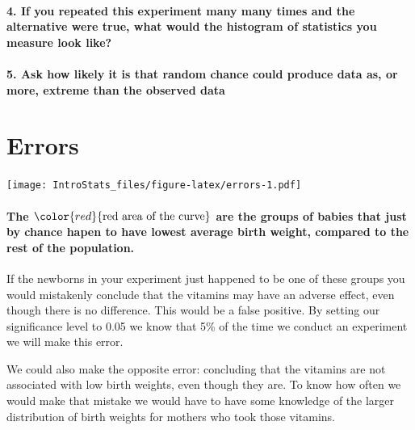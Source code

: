 \documentclass[]{article}
\let\oldparagraph\paragraph
\renewcommand{\paragraph}[1]{\oldparagraph{#1}\mbox{}}
\begin{document}
{{{{\paragraph{4. If you repeated this experiment many many times and the
alternative were true, what would the histogram of statistics you
measure look
like?}\label{if-you-repeated-this-experiment-many-many-times-and-the-alternative-were-true-what-would-the-histogram-of-statistics-you-measure-look-like}

\paragraph{5. Ask how likely it is that random chance could produce data
as, or more, extreme than the observed
data}\label{ask-how-likely-it-is-that-random-chance-could-produce-data-as-or-more-extreme-than-the-observed-data}

\section{Errors}\label{errors}

\texttt{[image: IntroStats\_files/figure-latex/errors-1.pdf]}

\paragraph{\texorpdfstring{The
\(\color{red}{\text{red area of the curve}}\) are the groups of babies
that just by chance hapen to have lowest average birth weight, compared
to the rest of the
population.}{The \textbackslash{}color\{red\}\{\textbackslash{}text\{red area of the curve\}\} are the groups of babies that just by chance hapen to have lowest average birth weight, compared to the rest of the population.}}\label{the-colorredtextred-area-of-the-curve-are-the-groups-of-babies-that-just-by-chance-hapen-to-have-lowest-average-birth-weight-compared-to-the-rest-of-the-population.}

If the newborns in your experiment just happened to be one of these
groups you would mistakenly conclude that the vitamins may have an
adverse effect, even though there is no difference. This would be a
false positive. By setting our significance level to 0.05 we know that
5\% of the time we conduct an experiment we will make this error.

We could also make the opposite error: concluding that the vitamins are
not associated with low birth weights, even though they are. To know how
often we would make that mistake we would have to have some knowledge of
the larger distribution of birth weights for mothers who took those
vitamins.

}}}}
\end{document}
